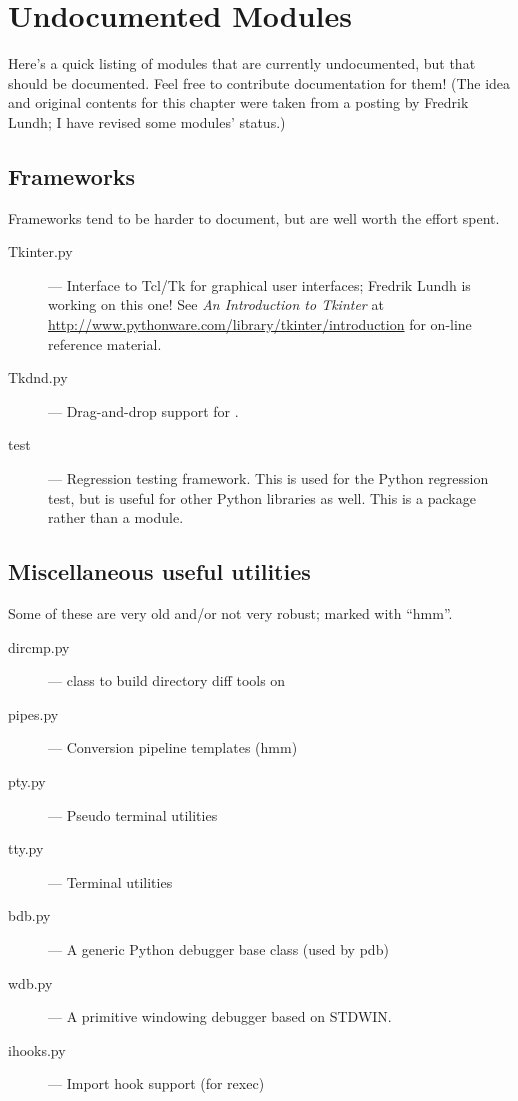\chapter{Undocumented Modules}
\label{undoc}

Here's a quick listing of modules that are currently undocumented, but
that should be documented.  Feel free to contribute documentation for
them!  (The idea and original contents for this chapter were taken
from a posting by Fredrik Lundh; I have revised some modules' status.)


\section{Frameworks}

Frameworks tend to be harder to document, but are well worth the
effort spent.

\begin{description}
\item[Tkinter.py]
--- Interface to Tcl/Tk for graphical user interfaces;
Fredrik Lundh is working on this one!  See \emph{An Introduction to
Tkinter} at
\url{http://www.pythonware.com/library/tkinter/introduction} for
on-line reference material.

\item[Tkdnd.py]
--- Drag-and-drop support for .

\item[test]
--- Regression testing framework.  This is used for the Python
regression test, but is useful for other Python libraries as well.
This is a package rather than a module.
\end{description}


\section{Miscellaneous useful utilities}

Some of these are very old and/or not very robust; marked with ``hmm''.

\begin{description}
\item[dircmp.py]
--- class to build directory diff tools on

\item[pipes.py]
--- Conversion pipeline templates (hmm)

\item[pty.py]
--- Pseudo terminal utilities

\item[tty.py]
--- Terminal utilities

\item[bdb.py]
--- A generic Python debugger base class (used by pdb)

\item[wdb.py]
--- A primitive windowing debugger based on STDWIN.

\item[ihooks.py]
--- Import hook support (for rexec)
\end{description}



